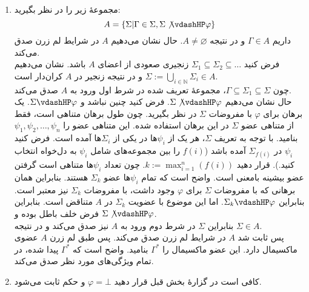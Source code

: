 \begin{ans}
    \begin{enumerate}[label=(\alph*)]
        \item
        مجموعهٔ زیر را در نظر بگیرید:
        $$A = \{\Sigma | \Gamma \in \Sigma , \Sigma \not\vdashHP \varphi\}$$
        داریم $\Gamma \in A$ و در نتیجه $A \neq \varnothing$. حال نشان می‌دهیم $A$ در شرایط لم زرن صدق می‌کند.\\
        فرض کنید $\Sigma_1 \subseteq \Sigma_2 \subseteq \dots$ زنجیری صعودی از اعضای $A$ باشد. نشان می‌دهیم $\Sigma := \bigcup_{i\in\mathbb{N}} \Sigma_i \in A$ و در نتیجه زنجیر در $A$ کران‌دار است.\\
        چون $\Gamma \subseteq \Sigma_1 \subseteq \Sigma$، مجموعهٔ تعریف شده در شرط اول ورود به $A$ صدق می‌کند.\\
        حال نشان می‌دهیم $\Sigma \not\vdashHP \varphi$. فرض کنید چنین نباشد و $\Sigma \vdashHP \varphi$. یک برهان برای $\varphi$ با مفروضات $\Sigma$ در نظر بگیرید. چون طول برهان متناهی است، فقط از متناهی عضو $\Sigma$ در این برهان استفاده شده. این متناهی عضو را $\psi_1, \psi_2, \dots, \psi_n$ بنامید. با توجه به تعریف $\Sigma$، هر یک از $\psi_i$ها در یکی از $\Sigma_i$ها آمده است. فرض کنید $\psi_i$ در $\Sigma_{f(i)}$ آمده باشد ($f(i)$ را بین مجموعه‌های شامل $\psi_i$ به دل‌خواه انتخاب کنید.). قرار دهید $k := \max_{i=1}^n(f(i))$. چون تعداد $\psi_i$ها متناهی است گرفتن عضو بیشینه بامعنی است. واضح است که تمام $\psi_i$ها عضو $\Sigma_k$ هستند. بنابراین همان برهانی که با مفروضات $\Sigma$ برای $\varphi$ وجود داشت، با مفروضات $\Sigma_k$ نیز معتبر است. بنابراین $\Sigma_k \vdashHP \varphi$. اما این موضوع با عضویت $\Sigma_k$ در $A$ متناقض است. بنابراین فرض خلف باطل بوده و $\Sigma \not\vdashHP \varphi$.\\
        بنابراین $\Sigma$ در شرط دوم ورود به $A$ نیز صدق می‌کند و در نتیجه $\Sigma \in A$.\\
        پس ثابت شد $A$ در شرایط لم زرن صدق می‌کند. پس طبق لم زرن $A$ عضوی ماکسیمال دارد. این عضو ماکسیمال را $\Gamma^*$ بنامید. واضح است که $\Gamma^*$ پیدا شده، در تمام ویژگی‌های مورد نظر صدق می‌کند.

        \item
        کافی است در گزارهٔ بخش قبل قرار دهید $\varphi = \bot$ و حکم ثابت می‌شود.


\end{enumerate}
\end{ans}
